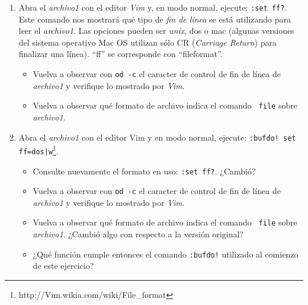 \documentclass[12pt]{article}
\begin{document}
\begin{enumerate}

    \item Abra el \emph{archivo1} con el editor \emph{Vim} y, en modo normal,
    ejecute: {\tt :set ff?}. Este comando nos mostrará qué tipo de {\it fin de
    línea} se está utilizando para leer el \emph{archivo1}.  Las opciones
    pueden ser \emph{unix}, dos o mac (algunas versiones del sistema operativo
    Mac OS utilizan sólo CR (\emph{Carriage Return}) para finalizar una
    línea). ``ff'' se corresponde con ``fileformat''.

    \begin{itemize}

        \item Vuelva a observar con {\tt od -c} el caracter de control de fin
        de línea de \emph{archivo1} y verifique lo mostrado por \emph{Vim}. 

        \item Vuelva a observar qué formato de archivo indica el comando {\tt
        file} sobre \emph{archivo1}. 

    \end{itemize} 

    \item Abra el \emph{archivo1} con el editor Vim y en modo normal, ejecute:
    {\tt :bufdo! set
    ff=dos|w}\footnote{http://Vim.wikia.com/wiki/File\_format}. 

    \begin{itemize}

        \item Consulte nuevamente el formato en uso: {\tt :set ff?}. ¿Cambió?

        \item Vuelva a observar con {\tt od -c} el caracter de control de fin
        de línea de \emph{archivo1} y verifique lo mostrado por \emph{Vim}. 

        \item Vuelva a observar qué formato de archivo indica el comando {\tt
        file} sobre \emph{archivo1}. ¿Cambió algo con respecto a la versión original? 

        \item ¿Qué función cumple entonces el comando {\tt :bufdo!} utilizado
        al comienzo de este ejercicio?

    \end{itemize}

\end{enumerate}
\end{document}

